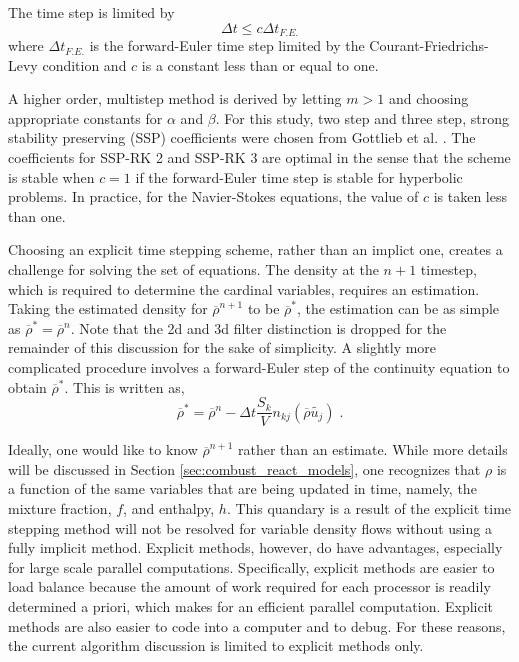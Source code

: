 The time step is limited by
%
\begin{equation}
\Delta t \leq c \Delta t_{F.E.}
\end{equation}
%
where $\Delta t_{F.E.}$ is the forward-Euler time step limited by
the Courant-Friedrichs-Levy condition and $c$ is a constant less
than or equal to one.  

A higher order, multistep method is derived by letting $m > 1$ and choosing appropriate constants for $\alpha$ and $\beta$. For this study, two step and three step, strong stability preserving (SSP) coefficients were chosen from Gottlieb et al. \cite{Gottlieb75}.  The coefficients for SSP-RK 2 and SSP-RK 3 are optimal in the sense that the scheme is stable when $c=1$ if the forward-Euler time step is stable for hyperbolic problems.  In practice, for the Navier-Stokes equations, the value of $c$ is taken less than one.

Choosing an explicit time stepping scheme, rather than an implict one, creates a challenge for solving the set of equations.  The density at the $n+1$ timestep, which is required to determine the cardinal variables,  requires an estimation.  Taking the estimated density for  $\overline{\rho}^{n+1}$ to be $\overline{\rho}^*$, the estimation can be as simple as $\overline{\rho}^* = \overline{\rho}^n$.  Note that the 2d and 3d filter distinction is dropped for the remainder of this discussion for the sake of simplicity.  A slightly more complicated procedure involves a forward-Euler step of the continuity equation to obtain $\overline{\rho}^*$.  This is written as,  
%
\begin{equation}\label{eqn:rho_update}
\overline{\rho}^{ *} = \overline{\rho}^{ n} - \Delta t \frac{S_k}{V} n_{kj} \left(  \overline{\rho} \widetilde{u_j} \right) \; .
\end{equation}
%

Ideally, one would like to know $\overline{\rho}^{n+1}$ rather than an estimate.  While more details will be discussed in Section \ref{sec:combust_react_models}, one recognizes that $\rho$ is a function of the same variables that are being updated in time, namely, the mixture fraction, $f$, and enthalpy, $h$.  This quandary is a result of the explicit time stepping method will not be resolved for variable density flows without using a fully implicit method.  Explicit methods, however, do have advantages, especially for large scale parallel computations.  Specifically, explicit methods are easier to load balance because the amount of work required for each processor is readily determined a priori, which makes for an efficient parallel computation.  Explicit methods are also easier to code into a computer and to debug.  For these reasons, the current algorithm discussion is limited to explicit methods only. 

